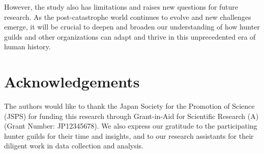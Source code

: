 \documentclass[12pt, a4paper]{article}
\begin{document}
However, the study also has limitations and raises new questions for future research. As the post-catastrophe world continues to evolve and new challenges emerge, it will be crucial to deepen and broaden our understanding of how hunter guilds and other organizations can adapt and thrive in this unprecedented era of human history.

\section*{Acknowledgements}
The authors would like to thank the Japan Society for the Promotion of Science (JSPS) for funding this research through Grant-in-Aid for Scientific Research (A) (Grant Number: JP12345678). We also express our gratitude to the participating hunter guilds for their time and insights, and to our research assistants for their diligent work in data collection and analysis.



\end{document}
